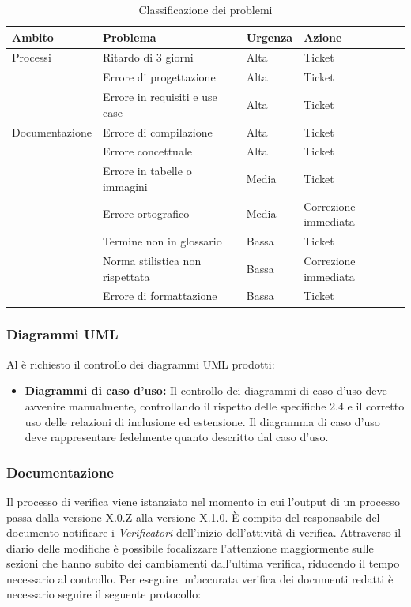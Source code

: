 \documentclass[12pt,a4paper]{article}
\begin{document}
\begin{table}[t]
\begin{tabular}{p{} p{} p{} p{}}
\toprule
\textbf{Ambito}	&	\textbf{Problema}	&	\textbf{Urgenza}	&	\textbf{Azione}\\
\midrule
\midrule
Processi & Ritardo di 3 giorni & Alta & Ticket \\
\midrule
& Errore di progettazione & Alta & Ticket \\
\midrule
& Errore in requisiti e use case & Alta & Ticket \\
\midrule
\midrule
Documentazione & Errore di compilazione & Alta & Ticket \\
\midrule
& Errore concettuale & Alta & Ticket \\
\midrule
& Errore in tabelle o immagini & Media & Ticket \\
\midrule
& Errore ortografico & Media & Correzione immediata \\
\midrule
& Termine non in glossario & Bassa & Ticket \\
\midrule
& Norma stilistica non rispettata & Bassa & Correzione immediata \\
\midrule
& Errore di formattazione & Bassa & Ticket \\
\bottomrule
\end{tabular}
\caption{Classificazione dei problemi}
\label{tabCalssificazioneProb}
\end{table}

\subsubsection{Diagrammi UML}
Al \VR è richiesto il controllo dei diagrammi UML prodotti:
\begin{itemize}
  \item \textbf{Diagrammi di caso d'uso:} Il controllo dei diagrammi di caso d'uso deve avvenire manualmente, controllando il rispetto delle specifiche  2.4 e il corretto uso delle relazioni di inclusione ed estensione. Il diagramma di caso d'uso deve rappresentare fedelmente quanto descritto dal caso d'uso.
\end{itemize}
  
\subsubsection{Documentazione}
Il processo di verifica viene istanziato nel momento in cui l'output di un processo passa dalla versione X.0.Z alla versione X.1.0. È compito del responsabile del documento notificare i \emph{Verificatori} dell'inizio dell'attività di verifica. Attraverso il diario delle modifiche è possibile focalizzare l'attenzione maggiormente sulle sezioni che hanno subito dei cambiamenti dall'ultima verifica, riducendo il tempo necessario al controllo. Per eseguire un'accurata verifica dei documenti redatti è necessario seguire il seguente protocollo:
\end{document}
